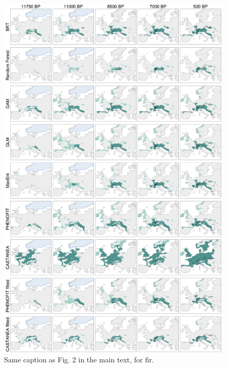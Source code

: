 \begin{figure}
\hspace*{-.3in}
\centering
\includegraphics{chapter2/figs/supp/figS5_abies_simulations-1.pdf}
\caption{Same caption as Fig. 2 in the main text, for fir.}
\label{fig:S5}
\end{figure}

